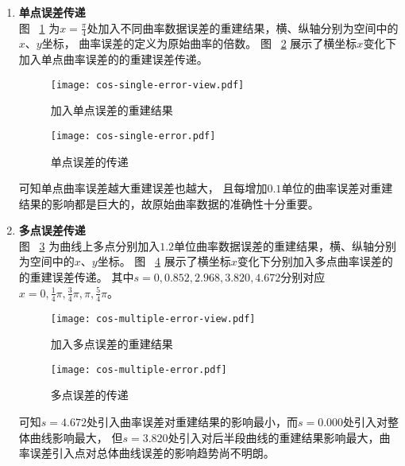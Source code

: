 \begin{enumerate}

\item \textbf{单点误差传递} \\

图 ~\ref{fig:cos-single-error-view} 为$x = \frac{\pi}{4}$处加入不同曲率数据误差的重建结果，横、纵轴分别为空间中的$x$、$y$坐标，
曲率误差的定义为原始曲率的倍数。
图 ~\ref{fig:cos-single-error} 展示了横坐标$x$变化下加入单点曲率误差的的重建误差传递。

\begin{figure}[H]
\centering
\texttt{[image: cos-single-error-view.pdf]}
\caption{加入单点误差的重建结果}
\label{fig:cos-single-error-view}
\end{figure}

\begin{figure}[H]
\centering
\texttt{[image: cos-single-error.pdf]}
\caption{单点误差的传递}
\label{fig:cos-single-error}
\end{figure}

可知单点曲率误差越大重建误差也越大，
且每增加$0.1$单位的曲率误差对重建结果的影响都是巨大的，故原始曲率数据的准确性十分重要。

\item \textbf{多点误差传递} \\

图 ~\ref{fig:cos-multiple-error-view} 为曲线上多点分别加入$1.2$单位曲率数据误差的重建结果，横、纵轴分别为空间中的$x$、$y$坐标。
图 ~\ref{fig:cos-multiple-error} 展示了横坐标$x$变化下分别加入多点曲率误差的的重建误差传递。
其中$s=0,0.852,2.968,3.820,4.672$分别对应$x=0,\frac{1}{4}\pi,\frac{3}{4}\pi,\pi,\frac{5}{4}\pi$。

\begin{figure}[H]
\centering
\texttt{[image: cos-multiple-error-view.pdf]}
\caption{加入多点误差的重建结果}
\label{fig:cos-multiple-error-view}
\end{figure}

\begin{figure}[H]
\centering
\texttt{[image: cos-multiple-error.pdf]}
\caption{多点误差的传递}
\label{fig:cos-multiple-error}
\end{figure}

可知$s=4.672$处引入曲率误差对重建结果的影响最小，而$s=0.000$处引入对整体曲线影响最大，
但$s=3.820$处引入对后半段曲线的重建结果影响最大，曲率误差引入点对总体曲线误差的影响趋势尚不明朗。

\end{enumerate}

